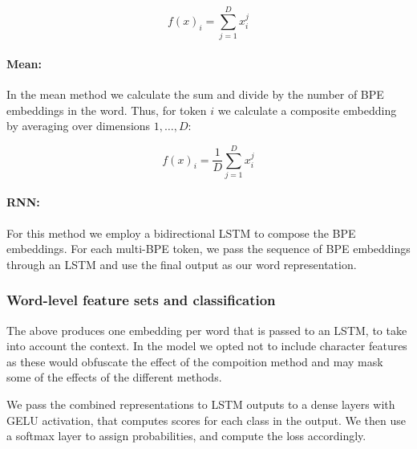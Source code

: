 \documentclass[11pt]{article}
\begin{document}
	\begin{equation}
	f(x)_i = \sum_{j=1}^{D} x_i^j
	\end{equation}
	

    	\paragraph{Mean:} In the mean method we calculate the sum and
     divide by the number of BPE embeddings in the word. Thus, for
     token $i$ we calculate a composite embedding by averaging over
     dimensions $1,\ldots,D$:
	
	\begin{equation}
	f(x)_{i} = \frac{1}{D}\sum_{j=1}^{D} x_i^j
	\end{equation}
	
	
        	\paragraph{RNN:} For this method we employ a bidirectional
     LSTM to compose the BPE embeddings. For each multi-BPE token, we
     pass the sequence of BPE embeddings through an LSTM and use the
     final output as our word representation.

       
        \subsubsection{Word-level feature sets and classification}
                   The above produces one embedding per word that is
     passed to an LSTM, to take into account the context. In the model
     we opted not to include character features as these would
     obfuscate the effect of the compoition method and may mask some
     of the effects of the different methods.

        We pass the combined representations to LSTM outputs to a
        dense layers with GELU activation, that computes scores
        for each class in the output. We then use a softmax layer to
        assign probabilities, and compute the loss accordingly.
\end{document}
